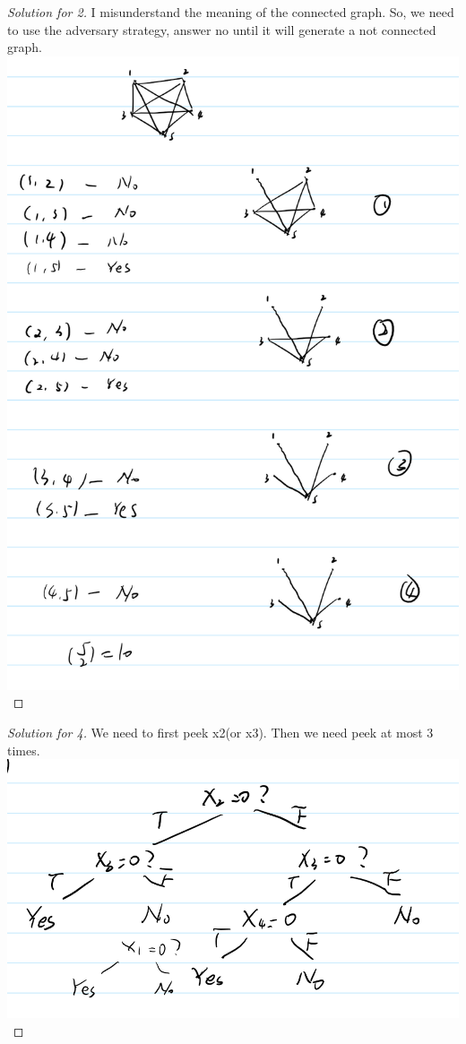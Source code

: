 \documentclass[12pt]{article}
\begin{document}
\begin{proof}[Solution for 2]
	I misunderstand the meaning of the connected graph. So, we need to use the adversary strategy, answer no until it will generate a not connected graph.\\
	\includegraphics[scale=0.26]{2.png}
\end{proof}
\begin{proof}[Solution for 4]
	We need to first peek x2(or x3). Then we need peek at most 3 times.\\
	\includegraphics[scale=0.25]{4.png}
\end{proof}
\end{document}
